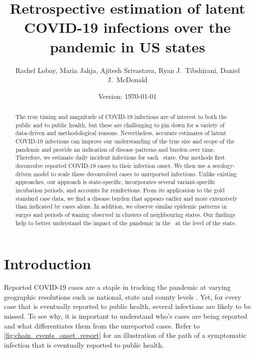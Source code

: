 \documentclass{article}
\begin{document}
\title{Retrospective estimation of latent COVID-19 infections over the pandemic in US states}
\author{Rachel Lobay, Maria Jahja, Ajitesh Srivastava, Ryan J.\ Tibshirani, Daniel J.\ McDonald}
\date{Version: \today}
\maketitle

\begin{abstract}
The true timing and magnitude of COVID-19 infections are of interest to both the public
and to public health, but these are challenging to pin down for a variety of data-driven
and methodological reasons. Nevertheless, accurate estimates of latent COVID-19 
infections can improve our understanding 
of the true size and scope of the pandemic and provide an indication of disease 
patterns and burden over time. Therefore, we estimate daily incident infections 
for each \US\ state. Our methods first deconvolve reported COVID-19 cases to 
their infection onset. We then use a serology-driven model to scale these 
deconvolved cases to unreported infections. Unlike existing approaches,
our approach is state-specific, incorporates several variant-specific incubation
periods, and accounts for reinfections. From its application to the gold standard case
data, we find a disease burden that appears earlier and more extensively than indicated
by cases alone. In addition, we observe similar epidemic patterns in surges and
periods of waning observed in clusters of neighbouring states. Our findings help to 
better understand the impact of the pandemic in the \US\ at the level of the state. 

\end{abstract}

\section{Introduction}

Reported COVID-19 cases are a staple in tracking the pandemic at varying
geographic resolutions such as national, state and county levels
\citep{dong2020interactive, nyt2020corona, wp2020tracking}. Yet, for every case
that is eventually reported to public health, several infections are likely to
be missed. To see why, it is important to understand who's cases are being reported and
 what differentiates them from the unreported cases. Refer to
\autoref{fig:chain_events_onset_report} for an illustration of the path of a
symptomatic infection that is eventually reported to public health. 
\end{document}
